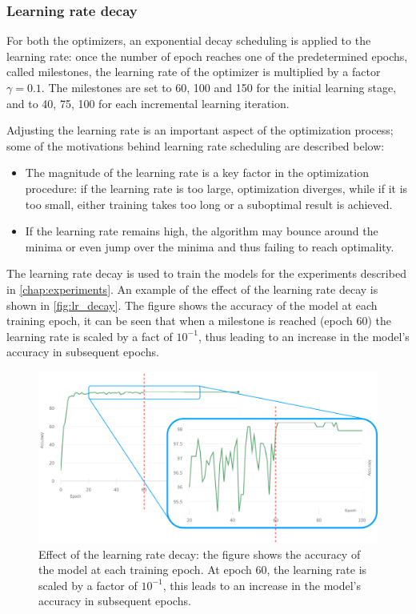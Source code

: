 \subsubsection{Learning rate decay}
For both the optimizers, an exponential decay scheduling is applied to the learning rate: once the number of epoch reaches one of the predetermined epochs, called milestones, the learning rate of the optimizer is multiplied by a factor $\gamma = 0.1$. The milestones are set to 60, 100 and 150 for the initial learning stage, and to 40, 75, 100 for each incremental learning iteration.

Adjusting the learning rate is an important aspect of the optimization process; some of the motivations behind learning rate scheduling are described below:
\begin{itemize}
    \item The magnitude of the learning rate is a key factor in the optimization procedure: if the learning rate is too large, optimization diverges, while if it is too small, either training takes too long or a suboptimal result is achieved.
    \item If the learning rate remains high, the algorithm may bounce around the minima or even jump over the minima and thus failing to reach optimality. 
\end{itemize}

The learning rate decay is used to train the models for the experiments described in \autoref{chap:experiments}. An example of the effect of the learning rate decay is shown in \autoref{fig:lr_decay}. The figure shows the accuracy of the model at each training epoch, it can be seen that when a milestone is reached (epoch 60) the learning rate is scaled by a fact of $10^{-1}$, thus leading to an increase in the model's accuracy in subsequent epochs.

\begin{figure}[H]
	\centering

    \begin{center}
        \includegraphics[width=\columnwidth]{images/lr_decay.drawio.png}
    \end{center}

	\caption{Effect of the learning rate decay: the figure shows the accuracy of the model at each training epoch. At epoch 60, the learning rate is scaled by a factor of $10^{-1}$, this leads to an increase in the model's accuracy in subsequent epochs. }
	\label{fig:lr_decay}%
\end{figure}


